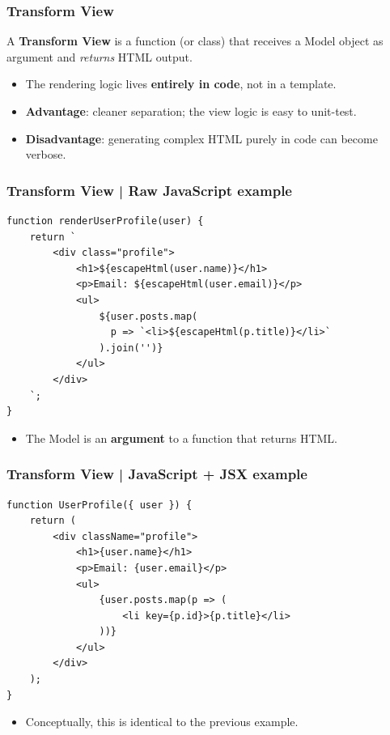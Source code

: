 \documentclass{beamer}
\begin{document}
\begin{frame}
  \frametitle{Transform View}

  A \textbf{Transform View} is a function (or class) that receives a Model object as argument
  and \textit{returns} HTML output.

  \begin{itemize}
    \item The rendering logic lives \textbf{entirely in code}, not in a template.
    \item \textbf{Advantage}: cleaner separation; the view logic is easy to unit-test.
    \item \textbf{Disadvantage}: generating complex HTML purely in code can become verbose.
  \end{itemize}

\end{frame}

\begin{frame}[fragile]
  \frametitle{Transform View | Raw JavaScript example}

  \begin{verbatim}
function renderUserProfile(user) {
    return `
        <div class="profile">
            <h1>${escapeHtml(user.name)}</h1>
            <p>Email: ${escapeHtml(user.email)}</p>
            <ul>
                ${user.posts.map(
                  p => `<li>${escapeHtml(p.title)}</li>`
                ).join('')}
            </ul>
        </div>
    `;
}
  \end{verbatim}

  \begin{itemize}
    \item The Model is an \textbf{argument} to a function that returns HTML.
  \end{itemize}

\end{frame}

\begin{frame}[fragile]
  \frametitle{Transform View | JavaScript + JSX example}

  \begin{verbatim}
function UserProfile({ user }) {
    return (
        <div className="profile">
            <h1>{user.name}</h1>
            <p>Email: {user.email}</p>
            <ul>
                {user.posts.map(p => (
                    <li key={p.id}>{p.title}</li>
                ))}
            </ul>
        </div>
    );
}
  \end{verbatim}

  \begin{itemize}
    \item Conceptually, this is identical to the previous example.
  \end{itemize}

\end{frame}
\end{document}
